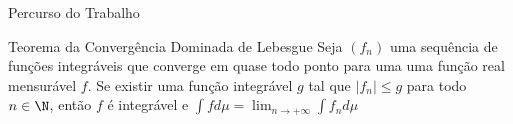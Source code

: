 	\begin{frame}{Percurso do Trabalho}
		\begin{block}{Teorema da Convergência Dominada de Lebesgue}
			Seja $(f_n)$ uma sequência de funções integráveis que converge em quase todo ponto para uma uma função real mensurável $f$.
			Se existir uma função integrável $g$ tal que $|f_n| \leq g$ para todo $n \in \N$, então $f$ é integrável e $\displaystyle \int f d\mu = \lim_{n \to +\infty} \int f_n d\mu$
		\end{block}
	\end{frame}
	
















	
	
	
	
	

